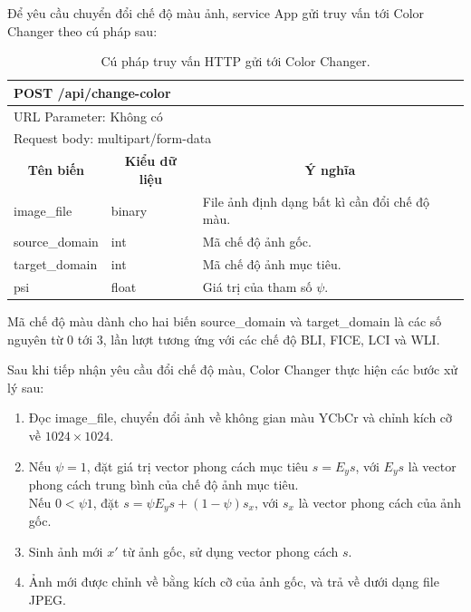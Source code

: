 \documentclass[12pt]{extreport}
\begin{document}
Để yêu cầu chuyển đổi chế độ màu ảnh, service App gửi truy vấn tới Color Changer theo cú pháp sau:
\begin{table}[H]
    \centering
    \begin{tabular}{l l l}
        \multicolumn{3}{l}{POST /api/change-color}                                                                                        \\
        \hline
        \multicolumn{3}{l}{URL Parameter: Không có}                                                                                       \\
        \hline
        \multicolumn{3}{l}{Request body: multipart/form-data}                                                                             \\
        \hline
        \multicolumn{1}{c}{\textbf{Tên biến}} & \multicolumn{1}{c}{\textbf{Kiểu dữ liệu}} & \multicolumn{1}{c}{\textbf{Ý nghĩa}}          \\
        \hline
        image\_file                           & binary                                    & File ảnh định dạng bất kì cần đổi chế độ màu. \\
        source\_domain                        & int                                       & Mã chế độ ảnh gốc.                            \\
        target\_domain                        & int                                       & Mã chế độ ảnh mục tiêu.                       \\
        psi                                   & float                                     & Giá trị của tham số $ \psi $.
    \end{tabular}
    \caption{Cú pháp truy vấn HTTP gửi tới Color Changer.}
\end{table}

Mã chế độ màu dành cho hai biến source\_domain và target\_domain là các số nguyên từ 0 tới 3, lần lượt tương ứng với các chế độ BLI, FICE, LCI và WLI.

Sau khi tiếp nhận yêu cầu đổi chế độ màu, Color Changer thực hiện các bước xử lý sau:
\begin{enumerate}
    \item Đọc image\_file, chuyển đổi ảnh về không gian màu YCbCr và chỉnh kích cỡ về $ 1024 \times 1024 $.
    \item Nếu $ \psi = 1 $, đặt giá trị vector phong cách mục tiêu $ s = E_y{s} $, với $ E_y{s} $ là vector phong cách trung bình của chế độ ảnh mục tiêu.\\ Nếu $ 0 < \psi 1 $, đặt $ s = \psi E_y{s} + (1 - \psi) s_x $, với $ s_x $ là vector phong cách của ảnh gốc.
    \item Sinh ảnh mới $ x' $ từ ảnh gốc, sử dụng vector phong cách $ s $.
    \item Ảnh mới được chỉnh về bằng kích cỡ của ảnh gốc, và trả về dưới dạng file JPEG.
\end{enumerate}
\end{document}
